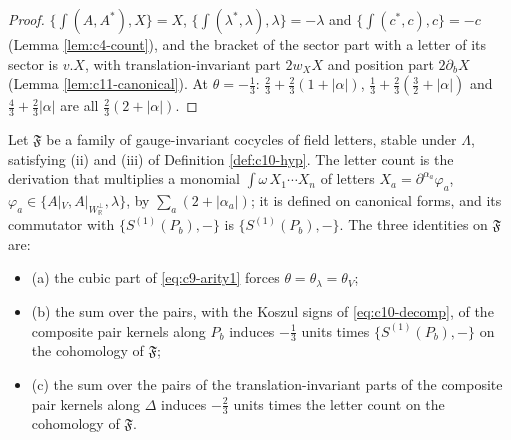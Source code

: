 \begin{proof}
$\{\int(A,A^*),X\}=X$, $\{\int(\lambda^*,\lambda),\lambda\}=-\lambda$ and $\{\int(c^*,c),c\}=-c$ (Lemma \ref{lem:c4-count}), and the bracket of the sector part with a letter of its sector is $v.X$, with translation-invariant part $2w_XX$ and position part $2\partial_bX$ (Lemma \ref{lem:c11-canonical}). At $\theta=-\tfrac13$: $\tfrac23+\tfrac23(1+|\alpha|)$, $\tfrac13+\tfrac23(\tfrac32+|\alpha|)$ and $\tfrac43+\tfrac23|\alpha|$ are all $\tfrac23(2+|\alpha|)$.
\end{proof}

\begin{definition}
\label{def:c11-P7}
Let $\mathfrak F$ be a family of gauge-invariant cocycles of field letters, stable under $\Lambda$, satisfying (ii) and (iii) of Definition \ref{def:c10-hyp}. The letter count is the derivation that multiplies a monomial $\int\omega\,X_1\cdots X_n$ of letters $X_a=\partial^{\alpha_a}\varphi_a$, $\varphi_a\in\{A|_V,A|_{W_{\mathbb R}^\perp},\lambda\}$, by $\sum_a(2+|\alpha_a|)$; it is defined on canonical forms, and its commutator with $\{S^{(1)}(P_b),-\}$ is $\{S^{(1)}(P_b),-\}$. The three identities on $\mathfrak F$ are:
\begin{itemize}
\item (a) the cubic part of \eqref{eq:c9-arity1} forces $\theta=\theta_\lambda=\theta_V$;
\item (b) the sum over the pairs, with the Koszul signs of \eqref{eq:c10-decomp}, of the composite pair kernels along $P_b$ induces $-\tfrac13$ units times $\{S^{(1)}(P_b),-\}$ on the cohomology of $\mathfrak F$;
\item (c) the sum over the pairs of the translation-invariant parts of the composite pair kernels along $\Delta$ induces $-\tfrac23$ units times the letter count on the cohomology of $\mathfrak F$.
\end{itemize}
\end{definition}

